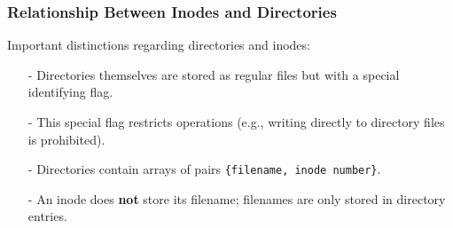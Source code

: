 \subsubsection{Relationship Between Inodes and Directories}
Important distinctions regarding directories and inodes:
\begin{itemize}
  \item[-] Directories themselves are stored as regular files but with a special identifying flag.
  \item[-] This special flag restricts operations (e.g., writing directly to directory files is prohibited).
  \item[-] Directories contain arrays of pairs \texttt{\{filename, inode number\}}.
  \item[-] An inode does \textbf{not} store its filename; filenames are only stored in directory entries.
\end{itemize}

\newpage
